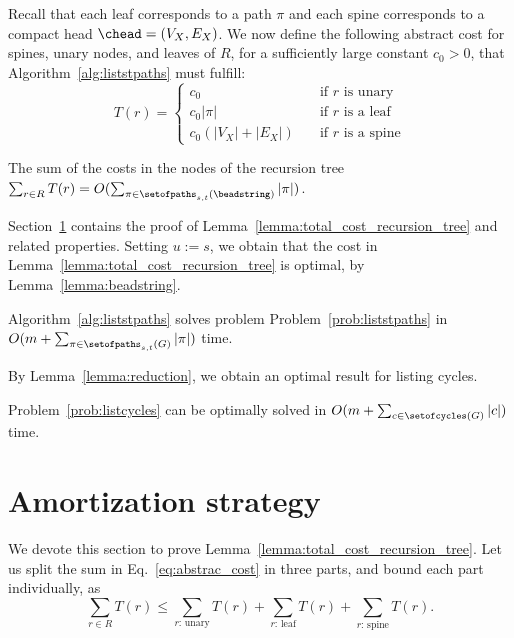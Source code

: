 Recall that each leaf corresponds to a path $\pi$ and each spine
corresponds to a
compact head $\chead=(V_X,E_X)$. We now define the following abstract
cost for spines, unary nodes, and leaves of $R$, for a sufficiently
large constant $c_0 > 0$, that Algorithm~\ref{alg:liststpaths} must
fulfill:
\begin{equation}
  \label{eq:abstrac_cost}
  T(r) =
  \left\{\begin{array}{ll}
      c_0 & \mbox{if $r$ is unary}\\ 
      c_0 |\pi| & \mbox{if $r$ is a leaf}\\ 
      c_0 (|V_X|+|E_X|) \quad & \mbox{if $r$ is a spine}
\end{array}\right. 
\end{equation}

\begin{lemma}
  \label{lemma:total_cost_recursion_tree}
  The sum of the costs in the nodes of the recursion tree $\sum_{r \in R} T(r) = O(\sum_{\pi \in \setofpaths_{s,t}(\beadstring)}{|\pi|})$.
\end{lemma}

Section~\ref{sec:recursion-amortization} contains the proof of
Lemma~\ref{lemma:total_cost_recursion_tree} and related properties.
Setting $u:=s$, we obtain that the cost in
Lemma~\ref{lemma:total_cost_recursion_tree} is optimal, by
Lemma~\ref{lemma:beadstring}.

\begin{theorem}
  \label{theorem:optimal_paths}
  Algorithm~\ref{alg:liststpaths} solves problem
  Problem~\ref{prob:liststpaths} in $O(m + \sum_{\pi \in
  \setofpaths_{s,t}(G)}{|\pi|})$ time.
\end{theorem}

By Lemma~\ref{lemma:reduction}, we obtain an optimal result for
listing cycles.

\begin{theorem}
  \label{theorem:optimal_cycles}
  Problem~\ref{prob:listcycles} can be optimally solved in \mbox{$O(m +
  \sum_{c \in \setofcycles(G)}{|c|})$} time. 
\end{theorem}

\section{Amortization strategy}
\label{sec:recursion-amortization}


We devote this section to prove
Lemma~\ref{lemma:total_cost_recursion_tree}. Let us split the sum
in Eq.~\eqref{eq:abstrac_cost} in three parts, and bound each part
individually, as
\begin{equation}
  \label{eq:sum_R}
  \sum_{r \in R} T(r) \leq \sum_{r:\,\mathrm{unary}} T(r) + \sum_{r:\,\mathrm{leaf}} T(r) + \sum_{r:\,\mathrm{spine}} T(r).
\end{equation}

